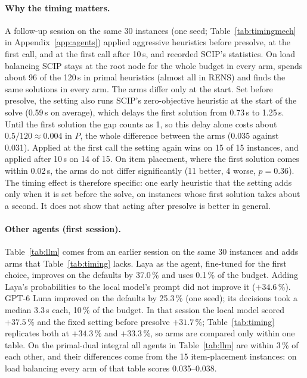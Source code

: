 \documentclass[11pt]{article}
\begin{document}
\paragraph{Why the timing matters.} A follow-up session on the same 30 instances (one seed; Table~\ref{tab:timingmech}
in Appendix~\ref{app:agents}) applied aggressive heuristics before presolve, at the first call, and at the first call
after 10\,s, and recorded SCIP's statistics. On load balancing SCIP stays at the root node for the whole budget in
every arm, spends about 96 of the 120\,s in primal heuristics (almost all in RENS) and finds the same solutions in
every arm. The arms differ only at the start. Set before presolve, the setting also runs SCIP's zero-objective
heuristic at the start of the solve (0.59\,s on average), which delays the first solution from 0.73\,s to 1.25\,s.
Until the first solution the gap counts as 1, so this delay alone costs about $0.5/120\approx0.004$ in $P$, the whole
difference between the arms (0.035 against 0.031). Applied at the first call the setting again wins on 15 of 15
instances, and applied after 10\,s on 14 of 15. On item placement, where the first solution comes within 0.02\,s, the
arms do not differ significantly (11 better, 4 worse, $p=0.36$). The timing effect is therefore specific: one early
heuristic that the setting adds only when it is set before the solve, on instances whose first solution takes about a
second. It does not show that acting after presolve is better in general.

\paragraph{Other agents (first session).} Table~\ref{tab:llm} comes from an earlier session on the same 30 instances
and adds arms that Table~\ref{tab:timing} lacks. Laya as the agent, fine-tuned for the first choice, improves on the
defaults by 37.0\,\% and uses 0.1\,\% of the budget. Adding Laya's probabilities to the local model's prompt did not
improve it ($+34.6\,\%$). GPT-6 Luna improved on the defaults by 25.3\,\% (one seed); its decisions took a median
3.3\,s each, 10\,\% of the budget. In that session the local model scored $+37.5\,\%$ and the fixed setting before
presolve $+31.7\,\%$; Table~\ref{tab:timing} replicates both at $+34.3\,\%$ and $+33.3\,\%$, so arms are compared only
within one table. On the primal-dual integral all agents in Table~\ref{tab:llm} are within 3\,\% of each other, and
their differences come from the 15 item-placement instances: on load balancing every arm of that table scores
0.035--0.038.

\end{document}
